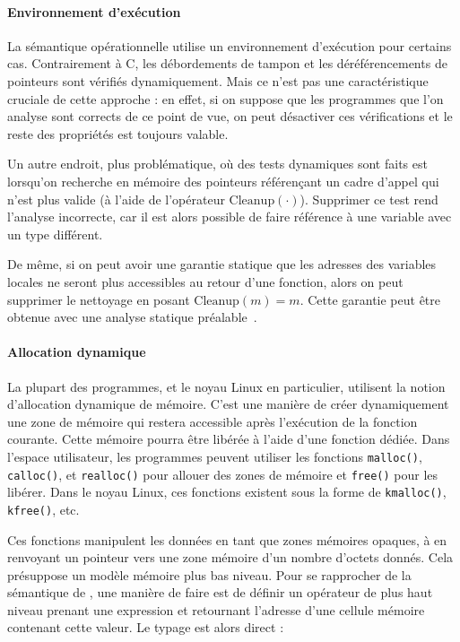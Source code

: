 \paragraph{Environnement d'exécution}

La sémantique opérationnelle utilise un environnement d'exécution pour certains
cas. Contrairement à C, les débordements de tampon et les déréférencements de
pointeurs sont vérifiés dynamiquement. Mais ce n'est pas une caractéristique
cruciale de cette approche : en effet, si on suppose que les programmes que l'on
analyse sont corrects de ce point de vue, on peut désactiver ces vérifications
et le reste des propriétés est toujours valable.

Un autre endroit, plus problématique, où des tests dynamiques sont faits est
lorsqu'on recherche en mémoire des pointeurs référençant un cadre d'appel qui
n'est plus valide (à l'aide de l'opérateur $\mathrm{Cleanup}(\cdot)$). Supprimer
ce test rend l'analyse incorrecte, car il est alors possible de faire référence
à une variable avec un type différent.

De même, si on peut avoir une garantie statique que les adresses des variables
locales ne seront plus accessibles au retour d'une fonction, alors on peut
supprimer le nettoyage en posant $\mathrm{Cleanup}(m) = m$. Cette garantie peut
être obtenue avec une analyse statique préalable~\cite{ifm10}.

\paragraph{Allocation dynamique}

La plupart des programmes, et le noyau Linux en particulier, utilisent la notion
d'allocation dynamique de mémoire. C'est une manière de créer dynamiquement une
zone de mémoire qui restera accessible après l'exécution de la fonction
courante. Cette mémoire pourra être libérée à l'aide d'une fonction dédiée. Dans
l'espace utilisateur, les programmes peuvent utiliser les fonctions
\texttt{malloc()}, \texttt{calloc()}, et \texttt{realloc()} pour allouer des
zones de mémoire et \texttt{free()} pour les libérer. Dans le noyau Linux, ces
fonctions existent sous la forme de \texttt{kmalloc()}, \texttt{kfree()}, etc.


Ces fonctions manipulent les données en tant que zones mémoires opaques, à
en renvoyant un pointeur vers une zone mémoire d'un nombre d'octets donnés.
Cela présuppose un modèle mémoire plus bas niveau. Pour se rapprocher de la
sémantique de \langname, une manière de faire est de définir un opérateur de
plus haut niveau prenant une expression et retournant l'adresse d'une cellule
mémoire contenant cette valeur. Le typage est alors direct :

